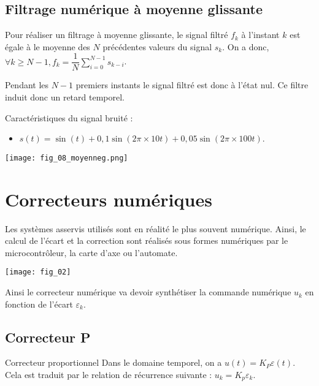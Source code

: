 \subsection{Filtrage numérique à moyenne glissante} 


\begin{minipage}[c]{.48\linewidth}
Pour réaliser un filtrage à moyenne glissante, le signal filtré $f_k$ à l'instant $k$ est égale à le moyenne des $N$ précédentes valeurs du signal $s_k$. On a donc, $\forall k \geq N-1, f_k = \dfrac{1}{N}\sum\limits_{i=0}^{N-1} s_{k-i}$.

Pendant les $N-1$ premiers instants le signal filtré est donc à l'état nul. Ce filtre induit donc un retard temporel.

Caractéristiques du signal bruité :
\begin{itemize}
\item $s(t)=\sin(t) + 0,1\sin(2\pi \times 10 t)+ 0,05\sin(2\pi \times 100 t)$.
\end{itemize}
\end{minipage}
\begin{minipage}[c]{.48\linewidth}
\begin{center}
\texttt{[image: fig\_08\_moyenneg.png]}
\end{center}
\end{minipage}

\section{Correcteurs numériques}
 
 Les systèmes asservis utilisés sont en réalité le plus souvent numérique. Ainsi, le calcul de l'écart et la correction sont 
 réalisés sous formes numériques par le microcontrôleur, la carte d'axe ou l'automate. 
 
 \begin{center}
\texttt{[image: fig\_02]}
\end{center}

Ainsi le correcteur numérique va devoir synthétiser la commande numérique $u_k$ en fonction de l'écart $\varepsilon_k$. 


 
\subsection{Correcteur P}
\begin{defi}{Correcteur proportionnel}
Dans le domaine temporel, on a $u(t)=K_P \varepsilon(t)$. Cela est traduit par le relation de récurrence suivante : 
$u_k = K_p \varepsilon_k$.
\end{defi}
